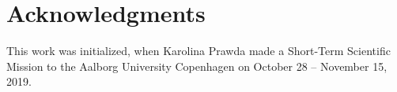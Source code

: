 \documentclass[twoside,a4paper]{article}
\begin{document}
\section{Acknowledgments}
This work was initialized, when Karolina Prawda made a Short-Term Scientific Mission to the Aalborg University Copenhagen on October 28 -- November 15, 2019. 


\end{document}
